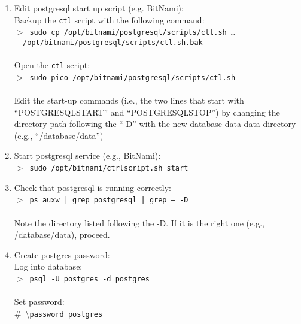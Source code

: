 \begin{enumerate}
{         ~~-D /database/data'}\\
         \\
         Note: a request will be made for postgres user's password, which may
         not be set yet.  If it is not set (i.e., the above command fails for 
         postgres password), first create a password for postgres and then
         try running the command again:\\
         $>$~\texttt{sudo passwd postgres}
   \item Edit postgresql start up script (e.g. BitNami):\\
   		 Backup the \texttt{ctl} script with the following command:\\
         $>$~\texttt{sudo cp /opt/bitnami/postgresql/scripts/ctl.sh \hfill \ldots \\
         ~~/opt/bitnami/postgresql/scripts/ctl.sh.bak}\\
         \\
         Open the \texttt{ctl} script:\\ 
         $>$~\texttt{sudo pico /opt/bitnami/postgresql/scripts/ctl.sh}\\
         \\
         Edit the start-up commands (i.e., the two lines that start with ``POSTGRESQL\textunderscore START'' and ``POSTGRESQL\textunderscore STOP'') by changing the directory path following the ``-D'' with the new database data data directory (e.g., ``/database/data'')
   \item Start postgresql service (e.g., BitNami):\\
         $>$~\texttt{sudo /opt/bitnami/ctrlscript.sh start}
   \item Check that postgresql is running correctly:\\
         $>$~\texttt{ps auxw | grep postgresql | grep -- -D}\\
         \\
         Note the directory listed following the -D.  If it is the right one 
         (e.g., /database/data), proceed.
   \item Create postgres password:\\
         Log into database:\\ 
         $>$~\texttt{psql -U postgres -d postgres}\\
         \\
         Set password:\\ 
         $\#$~\textbackslash \texttt{password postgres} \\

\end{enumerate}
